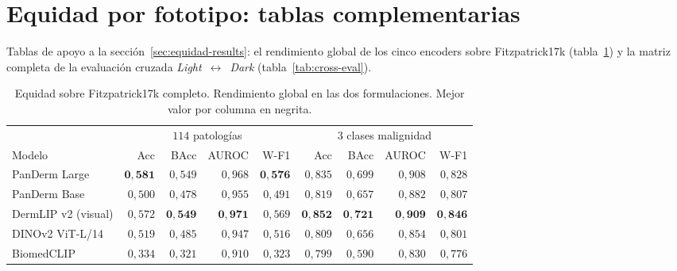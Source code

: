 \section{Equidad por fototipo: tablas complementarias}
\label{sec:anexob-equidad}

Tablas de apoyo a la sección~\ref{sec:equidad-results}: el rendimiento
global de los cinco encoders sobre Fitzpatrick17k
(tabla~\ref{tab:equidad-global}) y la matriz completa de la evaluación
cruzada \emph{Light}~$\leftrightarrow$~\emph{Dark}
(tabla~\ref{tab:cross-eval}).

\begin{table}[H]
\centering
\footnotesize
\setlength{\tabcolsep}{4pt}
\renewcommand{\arraystretch}{0.95}
\caption{Equidad sobre Fitzpatrick17k completo. Rendimiento global
en las dos formulaciones. Mejor valor por columna en negrita.}
\label{tab:equidad-global}
\begin{tabular}{lrrrrrrrr}
\hline
                          & \multicolumn{4}{c}{$114$ patologías} & \multicolumn{4}{c}{$3$ clases malignidad} \\
\cline{2-5}\cline{6-9}
Modelo                    & Acc           & BAcc          & AUROC         & W-F1          & Acc           & BAcc          & AUROC         & W-F1 \\
\hline
PanDerm Large             & $\mathbf{0{,}581}$ & $0{,}549$     & $0{,}968$     & $\mathbf{0{,}576}$ & $0{,}835$     & $0{,}699$     & $0{,}908$     & $0{,}828$ \\
PanDerm Base              & $0{,}500$     & $0{,}478$     & $0{,}955$     & $0{,}491$     & $0{,}819$     & $0{,}657$     & $0{,}882$     & $0{,}807$ \\
DermLIP v2 (visual)       & $0{,}572$     & $\mathbf{0{,}549}$ & $\mathbf{0{,}971}$ & $0{,}569$ & $\mathbf{0{,}852}$ & $\mathbf{0{,}721}$ & $\mathbf{0{,}909}$ & $\mathbf{0{,}846}$ \\
DINOv2 ViT-L/14           & $0{,}519$     & $0{,}485$     & $0{,}947$     & $0{,}516$     & $0{,}809$     & $0{,}656$     & $0{,}854$     & $0{,}801$ \\
BiomedCLIP                & $0{,}334$     & $0{,}321$     & $0{,}910$     & $0{,}323$     & $0{,}799$     & $0{,}590$     & $0{,}830$     & $0{,}776$ \\
\hline
\end{tabular}
\end{table}

